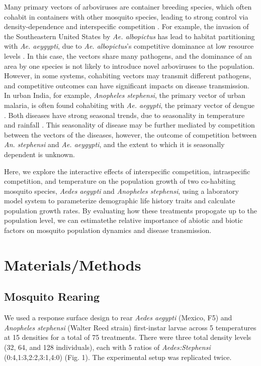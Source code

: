 \documentclass[12pt,]{article}
\begin{document}
Many primary vectors of arboviruses are container breeding species,
which often cohabit in containers with other mosquito species, leading
to strong control via density-dependence and interspecific competition
\citep{juliano2010}. For example, the invasion of the Southeastern
United States by \emph{Ae. albopictus} has lead to habitat partitioning
with \emph{Ae. aeygypti}, due to \emph{Ae. albopictus}'s competitive
dominance at low resource levels \citep{fader2016}. In this case, the
vectors share many pathogens, and the dominance of an area by one
species is not likely to introduce novel arboviruses to the population.
However, in some systems, cohabiting vectors may transmit different
pathogens, and competitive outcomes can have significant impacts on
disease transmission. In urban India, for example, \emph{Anopheles
stephensi}, the primary vector of urban malaria, is often found
cohabiting with \emph{Ae. aegypti}, the primary vector of dengue
\citep{thomas2016}. Both diseases have strong seasonal trends, due to
seasonality in temperature and rainfall \citep{santos-vega2016a}. This
seasonality of disease may be further mediated by competition between
the vectors of the diseases, however, the outcome of competition between
\emph{An. stephensi} and \emph{Ae. aeygypti}, and the extent to which it
is seasonally dependent is unknown.

Here, we explore the interactive effects of interspecific competition,
intraspecific competition, and temperature on the population growth of
two co-habiting mosquito species, \emph{Aedes aegypti} and
\emph{Anopheles stephensi}, using a laboratory model system to
parameterize demographic life history traits and calculate population
growth rates. By evaluating how these treatments propogate up to the
population level, we can estimatethe relative importance of abiotic and
biotic factors on mosquito population dynamics and disease transmission.

\section{Materials/Methods}\label{materialsmethods}

\subsection{Mosquito Rearing}\label{mosquito-rearing}

We used a response surface design to rear \emph{Aedes aegypti} (Mexico,
F5) and \emph{Anopheles stephensi} (Walter Reed strain) first-instar
larvae across 5 temperatures at 15 densities for a total of 75
treatments. There were three total density levels (32, 64, and 128
individuals), each with 5 ratios of \textit{Aedes:Stephensi}
(0:4,1:3,2:2,3:1,4:0) (Fig. 1). The experimental setup was replicated
twice.
\end{document}
